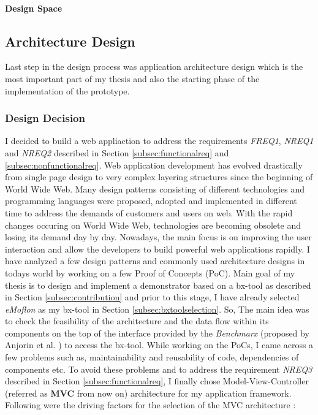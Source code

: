 \paragraph{Design Space} 

\subsection{Architecture Design}\label{subsec:architecturedesign}
Last step in the design process was application architecture design which is the most important part of my thesis and also the starting phase of the implementation of the prototype.
\subsubsection{Design Decision}\label{subsubsec:architecturedesigndecision}
I decided to build a web appliaction to address the requirements \textit{FREQ1}, \textit{NREQ1} and \textit{NREQ2} described in Section \ref{subsec:functionalreq} and \ref{subsec:nonfunctionalreq}.
\newline\newline Web application development has evolved drastically from single page design to very complex layering structures since the beginning of World Wide Web. Many design patterns \cite{designpattern} \cite{designpattern-notes} consisting of different technologies and programming languages were proposed, adopted and implemented in different time to address the demands of customers and users on web. With the rapid changes occuring on World Wide Web, technologies are becoming obsolete and losing its demand day by day. Nowadays, the main focus is on improving the user interaction and allow the developers to build powerful web applications rapidly.
\newline\newline I have analyzed a few design patterns and commonly used architecture designs in todays world by working on a few Proof of Concepts (PoC). Main goal of my thesis is to design and implement a demonstrator based on a bx-tool as described in Section \ref{subsec:contribution} and prior to this stage, I have already selected \textit{eMoflon} as my bx-tool in Section \ref{subsec:bxtoolselection}. So, The main idea was to check the feasibility of the architecture and the data flow within its components on the top of the interface provided by the \textit{Benchmarx} (proposed by Anjorin et al. \cite{benchmarx-reload}) to access the bx-tool. While working on the PoCs, I came across a few problems such as, maintainability and reusability of code, dependencies of components etc. To avoid these problems and to address the requirement \textit{NREQ3} described in Section \ref{subsec:functionalreq}, I finally chose Model-View-Controller (referred as \textbf{MVC} from now on) architecture for my application framework. Following were the driving factors for the selection of the MVC architecture \cite{designpattern-notes} \cite{designpattern-headfirst} :
